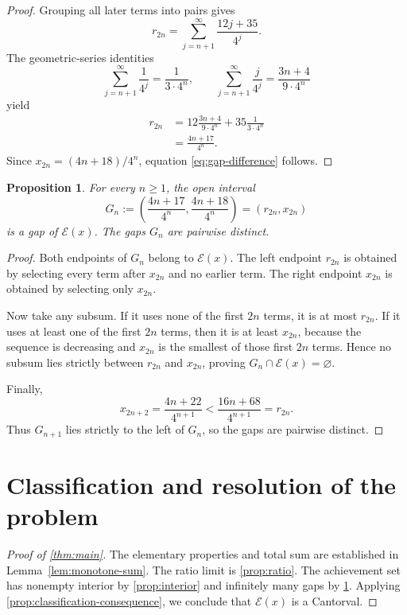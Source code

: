 \documentclass[11pt,letterpaper]{article}
\theoremstyle{metriqthm}
\newtheorem{proposition}[theorem]{Proposition}
\theoremstyle{metriqdef}
\newcommand{\E}{\mathcal{E}}
\begin{document}
\begin{proof}
Grouping all later terms into pairs gives
\[
  r_{2n}
  =\sum_{j=n+1}^{\infty}\frac{12j+35}{4^j}.
\]
The geometric-series identities
\[
  \sum_{j=n+1}^{\infty}\frac1{4^j}=\frac{1}{3\cdot4^n},
  \qquad
  \sum_{j=n+1}^{\infty}\frac{j}{4^j}=\frac{3n+4}{9\cdot4^n}
\]
yield
\begin{align*}
  r_{2n}
  &=12\frac{3n+4}{9\cdot4^n}
    +35\frac{1}{3\cdot4^n}\\
  &=\frac{4n+17}{4^n}.
\end{align*}
Since $x_{2n}=(4n+18)/4^n$, equation \eqref{eq:gap-difference} follows.
\end{proof}

\begin{proposition}\label{prop:gaps}
For every $n\ge1$, the open interval
\begin{equation}\label{eq:gap}
  G_n
  :=
  \left(
    \frac{4n+17}{4^n},
    \frac{4n+18}{4^n}
  \right)
  =(r_{2n},x_{2n})
\end{equation}
is a gap of $\E(x)$. The gaps $G_n$ are pairwise distinct.
\end{proposition}

\begin{proof}
Both endpoints of $G_n$ belong to $\E(x)$. The left endpoint $r_{2n}$ is obtained by selecting every term after $x_{2n}$ and no earlier term. The right endpoint $x_{2n}$ is obtained by selecting only $x_{2n}$.

Now take any subsum. If it uses none of the first $2n$ terms, it is at most $r_{2n}$. If it uses at least one of the first $2n$ terms, then it is at least $x_{2n}$, because the sequence is decreasing and $x_{2n}$ is the smallest of those first $2n$ terms. Hence no subsum lies strictly between $r_{2n}$ and $x_{2n}$, proving $G_n\cap\E(x)=\varnothing$.

Finally,
\[
  x_{2n+2}
  =\frac{4n+22}{4^{n+1}}
  <\frac{16n+68}{4^{n+1}}
  =r_{2n}.
\]
Thus $G_{n+1}$ lies strictly to the left of $G_n$, so the gaps are pairwise distinct.
\end{proof}

\section{Classification and resolution of the problem}

\begin{proof}[Proof of \cref{thm:main}]
The elementary properties and total sum are established in Lemma~\ref{lem:monotone-sum}. The ratio limit is \cref{prop:ratio}. The achievement set has nonempty interior by \cref{prop:interior} and infinitely many gaps by \cref{prop:gaps}. Applying \cref{prop:classification-consequence}, we conclude that $\E(x)$ is a Cantorval.
\end{proof}
\end{document}
